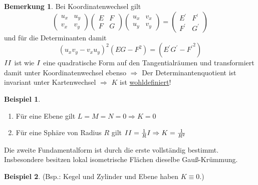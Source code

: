 \documentclass[a4paper,11pt,notitlepage]{report}
\theoremstyle{definition}
\newtheorem{remark}{Bemerkung}[chapter]
\newtheorem{example}{Beispiel}[chapter]
\newcommand{\RM}[1]{\MakeUppercase{\romannumeral #1{}}}
\begin{document}
\begin{remark}
	Bei Koordinatenwechsel gilt
	$$\begin{pmatrix}	u_x & u_y \\ v_x & v_y
	\end{pmatrix}		
	\begin{pmatrix}
	E & F \\ F & G
	\end{pmatrix}	
	\begin{pmatrix}
	u_x & v_x \\ u_y & v_y
	\end{pmatrix}			
	=	
	\begin{pmatrix}
	E^\prime & F^\prime \\ F^\prime & G^\prime
	\end{pmatrix}$$
	und für die Determinanten damit
	$$(u_xv_y - v_x u_y)^2 (EG - F^2) = (E^\prime G^\prime - {F^\prime}^2)$$
	$\RM{2}$ ist wie $\RM{1}$ eine quadratische Form auf den Tangentialräumen und transformiert damit unter Koordinatenwechsel ebenso \newline
	$\Rightarrow$ Der Determinantenquotient ist invariant unter Kartenwechsel \newline
	$\Rightarrow$ $K$ ist \underline{wohldefiniert}!	
\end{remark}

\begin{example}
	\begin{enumerate}
		\item Für eine Ebene gilt $L=M=N=0 \Rightarrow K = 0$
		\item Für eine Sphäre von Radius $R$ gilt $\RM{2} = \frac{1}{R} \RM{1} \Rightarrow K = \frac{1}{R^2}$ 
	\end{enumerate}
\end{example}

\begin{theorem}
	Die zweite Fundamentalform ist durch die erste vollständig bestimmt. Insbesondere besitzen lokal isometrische Flächen dieselbe Gauß-Krümmung.
\end{theorem}

\begin{example}
	(Bsp.: Kegel und Zylinder und Ebene haben $K \equiv 0$.)
\end{example}
\end{document}
